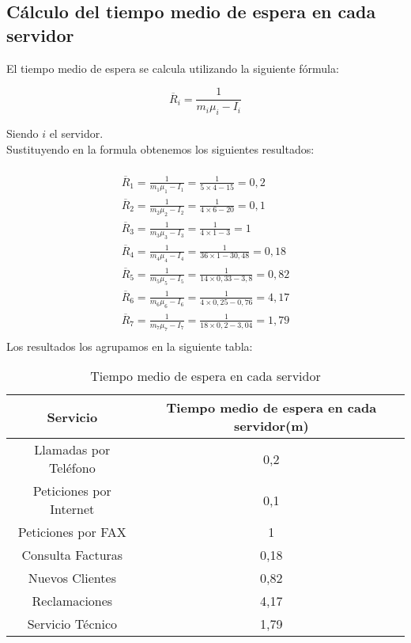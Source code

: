 \subsection{Cálculo del tiempo medio de espera en cada servidor}

El tiempo medio de espera se calcula utilizando la siguiente fórmula:

\begin{equation}
\overline{R}_{i} = \frac{1}{m_{i}\mu_{i}-I_{i}}
\end{equation}

Siendo $i$ el servidor.\\

Sustituyendo en la formula obtenemos los siguientes resultados:

\begin{multline}\\
\overline{R}_{1} = \frac{1}{m_{1}\mu_{1}-I_{1}} = \frac{1}{5\times 4 - 15} = 0,2\\
\overline{R}_{2} = \frac{1}{m_{2}\mu_{2}-I_{2}} = \frac{1}{4\times 6 - 20} = 0,1\\
\overline{R}_{3} = \frac{1}{m_{3}\mu_{3}-I_{3}} = \frac{1}{4\times 1 - 3} = 1\\
\overline{R}_{4} = \frac{1}{m_{4}\mu_{4}-I_{4}} = \frac{1}{36\times 1 - 30,48} = 0,18\\
\overline{R}_{5} = \frac{1}{m_{5}\mu_{5}-I_{5}} = \frac{1}{14\times 0,33 - 3,8} = 0,82\\
\overline{R}_{6} = \frac{1}{m_{6}\mu_{6}-I_{6}} = \frac{1}{4\times 0,25 - 0,76} = 4,17\\
\overline{R}_{7} = \frac{1}{m_{7}\mu_{7}-I_{7}} = \frac{1}{18\times 0,2 - 3,04} = 1,79\\
\end{multline}
Los resultados los agrupamos en la siguiente tabla:

\begin{table}[H]
  \begin{center}
  \begin{tabular}{|c|c|}
    \hline
    \textbf{Servicio}       & \textbf{Tiempo medio de espera en cada servidor(m)} \\ \hline
    Llamadas por Teléfono   & 0,2                   \\ \hline
    Peticiones por Internet & 0,1                  \\ \hline
    Peticiones por FAX      & 1                   \\ \hline
    Consulta Facturas      & 0,18                   \\ \hline
    Nuevos Clientes      & 0,82                   \\ \hline
    Reclamaciones      & 4,17                   \\ \hline
    Servicio Técnico      & 1,79                   \\ \hline
  \end{tabular}
\end{center}
  \caption{Tiempo medio de espera en cada servidor}
  \end{table}
  
